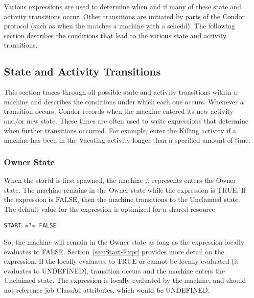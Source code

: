 Various expressions are used to determine when and if many of these
state and activity transitions occur.  Other transitions are initiated
by parts of the Condor protocol (such as when the 
matches a machine with a schedd).  The following section describes the
conditions that lead to the various state and activity transitions.

\subsection{\label{sec:State-and-Activity-Transitions}
State and Activity Transitions}

This section traces through all possible state and activity
transitions within a machine and describes the conditions under which
each one occurs.
Whenever a transition occurs, Condor records when the machine entered its
new activity and/or new state.
These times are often used to write expressions that determine
when further transitions occurred.
For example, enter the Killing activity if a machine has been in
the Vacating activity longer than a specified amount of time. 

\subsubsection{\label{sec:Owner-State}
Owner State}

When the startd is first spawned, the machine it represents enters the
Owner state. 
The machine remains in the Owner state while the
expression  is TRUE.
If the  expression is FALSE,
then the machine transitions to the Unclaimed state.
The default value for the 
 expression is optimized for a shared resource
\begin{verbatim}
START =?= FALSE
\end{verbatim}
So,
the machine will remain in the Owner state as long as the 
expression locally evaluates to FALSE.
Section~\ref{sec:Start-Expr} provides more detail on the
 expression.
If the  locally evaluates to TRUE or cannot be locally
evaluated (it evaluates to UNDEFINED), transition 
occurs and the machine enters the Unclaimed state.
The  expression is locally evaluated by the machine,
and should not reference job ClassAd attributes, which would be
UNDEFINED.

